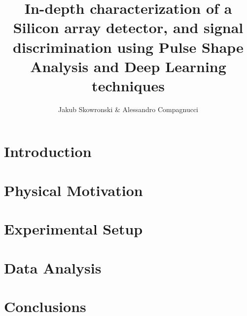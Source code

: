 \documentclass[a4paper, 11pt]{article}
\author{Jakub Skowronski \& Alessandro Compagnucci}
\title{In-depth characterization of a Silicon array detector, and signal discrimination using Pulse Shape Analysis and Deep Learning techniques}
\begin{document}
\maketitle

\clearpage

\tableofcontents

\clearpage

\section{Introduction}



\clearpage

\section{Physical Motivation}



\clearpage

\section{Experimental Setup}



\clearpage

\section{Data Analysis}





\clearpage

\section{Conclusions}



\clearpage


\end{document}

